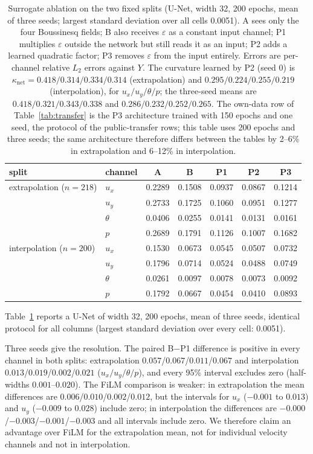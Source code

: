 \documentclass[preprint,11pt,a4paper,times,doubleblind]{elsarticle}
\begin{document}
\begin{table}[htbp]
\centering
\footnotesize
\setlength{\tabcolsep}{3pt}
\caption{Surrogate ablation on the two fixed splits (U-Net, width 32, 200 epochs, mean of three
seeds; largest standard deviation over all cells 0.0051). A sees only the four Boussinesq fields;
B also receives $\varepsilon$ as a constant input channel; P1 multiplies $\varepsilon$ outside the
network but still reads it as an input; P2 adds a learned quadratic factor; P3 removes
$\varepsilon$ from the input entirely. Errors are per-channel relative $L_2$ errors against $Y$.
The curvature learned by P2 (seed 0) is $\kappa_{\mathrm{net}}=0.418/0.314/0.334/0.314$ (extrapolation) and
$0.295/0.224/0.255/0.219$ (interpolation), for $u_x/u_y/\theta/p$; the three-seed means are
$0.418/0.321/0.343/0.338$ and $0.286/0.232/0.252/0.265$. The own-data row of
Table~\ref{tab:transfer} is the P3 architecture trained with 150 epochs and one seed, the protocol
of the public-transfer rows; this table uses 200 epochs and three seeds; the same architecture therefore differs between the
tables by 2--6\% in extrapolation and 6--12\% in interpolation.}
\label{tab:ablation}
\begin{tabular}{@{}p{3.2cm}p{1.0cm}ccccc@{}}
\toprule
split & channel & A & B & P1 & P2 & P3\\
\midrule
extrapolation ($n=218$) & $u_x$ & 0.2289 & 0.1508 & 0.0937 & 0.0867 & 0.1214\\
 & $u_y$ & 0.2733 & 0.1725 & 0.1060 & 0.0951 & 0.1277\\
 & $\theta$ & 0.0406 & 0.0255 & 0.0141 & 0.0131 & 0.0161\\
 & $p$ & 0.2689 & 0.1791 & 0.1126 & 0.1007 & 0.1682\\
interpolation ($n=200$) & $u_x$ & 0.1530 & 0.0673 & 0.0545 & 0.0507 & 0.0732\\
 & $u_y$ & 0.1796 & 0.0714 & 0.0524 & 0.0488 & 0.0749\\
 & $\theta$ & 0.0261 & 0.0097 & 0.0078 & 0.0073 & 0.0092\\
 & $p$ & 0.1792 & 0.0667 & 0.0454 & 0.0410 & 0.0893\\
\bottomrule
\end{tabular}
\end{table}

Table~\ref{tab:ablation} reports a U-Net of width 32, 200 epochs, mean of three seeds, identical
protocol for all columns (largest standard deviation over every cell: 0.0051).

Three seeds give the resolution. The paired B$-$P1 difference is positive in every channel in both
splits: extrapolation $0.057$/$0.067$/$0.011$/$0.067$ and interpolation
$0.013$/$0.019$/$0.002$/$0.021$ ($u_x/u_y/\theta/p$), and every 95\% interval excludes zero
(half-widths $0.001$--$0.020$). The FiLM comparison is weaker: in extrapolation the mean
differences are $0.006$/$0.010$/$0.002$/$0.012$, but the intervals for $u_x$ ($-0.001$ to $0.013$)
and $u_y$ ($-0.009$ to $0.028$) include zero; in interpolation the differences are
$-0.000$/$-0.003$/$-0.001$/$-0.003$ and all intervals include zero. We therefore claim an
advantage over FiLM for the extrapolation mean, not for individual velocity channels and not in
interpolation.
\end{document}
